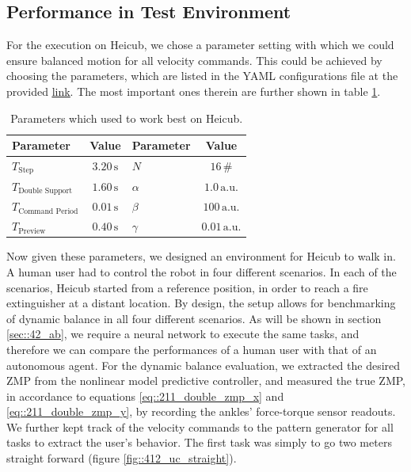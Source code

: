 \subsection{Performance in Test Environment}
\label{sec::412_pt}
For the execution on Heicub, we chose a parameter setting with which we could ensure balanced motion for all velocity commands. This could be achieved by choosing the parameters, which are listed in the YAML configurations file at the provided \href{https://github.com/mhubii/nmpc_pattern_generator/blob/719fde0bb73925923de85cbf379c5523e075dfeb/libs/pattern_generator/configs.yaml#L1}{\underline{link}}. The most important ones therein are further shown in table \ref{tab::412_params}.
\begin{table}
	\centering
	\caption{Parameters which used to work best on Heicub.}
	\begin{tabular}{lclc}
		Parameter&Value&Parameter&Value\\
		\hline
		$T_{\text{Step}}$ & $3.20\,\text{s}$ & $N$ & $16\,\text{\#}$ \\
		$T_{\text{Double Support}}$ & $1.60\,\text{s}$ & $\alpha$ & $1.0\,\text{a.u.}$ \\
		$T_{\text{Command Period}}$  & $0.01\,\text{s}$& $\beta$ & $100\,\text{a.u.}$ \\
		$T_{\text{Preview}}$ & $0.40\,\text{s}$ & $\gamma$ & $0.01\,\text{a.u.}$
	\end{tabular}
	\label{tab::412_params}
\end{table}
Now given these parameters, we designed an environment for Heicub to walk in. A human user had to control the robot in four different scenarios. In each of the scenarios, Heicub started from a reference position, in order to reach a fire extinguisher at a distant location. By design, the setup allows for benchmarking of dynamic balance in all four different scenarios. As will be shown in section \ref{sec::42_ab}, we require a neural network to execute the same tasks, and therefore we can compare the performances of a human user with that of an autonomous agent. For the dynamic balance evaluation, we extracted the desired ZMP from the nonlinear model predictive controller, and measured the true ZMP, in accordance to equations \ref{eq::211_double_zmp_x} and \ref{eq::211_double_zmp_y}, by recording the ankles' force-torque sensor readouts. We further kept track of the velocity commands to the pattern generator for all tasks to extract the user's behavior. The first task was simply to go two meters straight forward (figure \ref{fig::412_uc_straight}).
